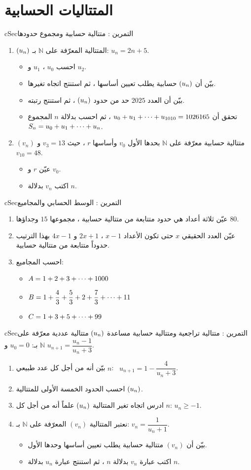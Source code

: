 \documentclass[12pt,a4paper]{article}
\newenvironment{BOX}[2]{\begin{otherlanguage}{english}\begin{arbox}{#1}{#2}}{\end{arbox}\end{otherlanguage}}
\newcounter{exo}
\newenvironment{tamrin}[1]{\stepcounter{exo}\begin{BOX}{cSec}{التمرين \theexo: #1}}{\end{BOX}}
\renewcommand{\cdots}{\mathinner{\cdotp\cdotp\cdotp}}
\newcommand{\N}{\mathbb{N}}
\newenvironment{sq}{\begin{itemize}[leftmargin=2.4em,itemsep=3pt]}{\end{itemize}}
\newcommand{\qa}{\item[(أ)]}\newcommand{\qb}{\item[(ب)]}\newcommand{\qc}{\item[(جـ)]}\newcommand{\qd}{\item[(د)]}\newcommand{\qe}{\item[(هـ)]}
\begin{document}
\section{المتتاليات الحسابية}
\begin{tamrin}{متتالية حسابية ومجموع حدودها}
\begin{enumerate}
\item $(u_n)$ المتتالية المعرّفة على $\N$ بـ: $u_n=2n+5$.
\begin{sq}
\qa احسب $u_0$ ، $u_1$ و $u_2$.
\qb بيّن أن $(u_n)$ حسابية يطلب تعيين أساسها ، ثم استنتج اتجاه تغيرها.
\qc بيّن أن العدد $2025$ حد من حدود $(u_n)$ ، ثم استنتج رتبته.
\qd تحقق أن $u_0+u_1+\cdots+u_{1010}=1026165$ ، ثم احسب بدلالة $n$ المجموع $S_n=u_0+u_1+\cdots+u_n$.
\end{sq}
\item $(v_n)$ متتالية حسابية معرّفة على $\N$ بحدها الأول $v_0$ وأساسها $r$ ، حيث $v_3=13$ و $v_{10}=48$.
\begin{sq}
\qa عيّن $r$ و $v_0$.
\qb اكتب $v_n$ بدلالة $n$.
\end{sq}
\end{enumerate}
\end{tamrin}

\begin{tamrin}{الوسط الحسابي والمجاميع}
\begin{enumerate}
\item عيّن ثلاثة أعداد هي حدود متتابعة من متتالية حسابية ، مجموعها $15$ وجداؤها $80$.
\item عيّن العدد الحقيقي $x$ حتى تكون الأعداد $x-1$ ، $2x+1$ و $4x-1$ بهذا الترتيب حدوداً متتابعة من متتالية حسابية.
\item احسب المجاميع:
\begin{sq}
\qa $A=1+2+3+\cdots+1000$
\qb $B=1+\dfrac43+\dfrac53+2+\dfrac73+\cdots+11$
\qc $C=1+3+5+\cdots+99$
\end{sq}
\end{enumerate}
\end{tamrin}

\begin{tamrin}{متتالية تراجعية ومتتالية حسابية مساعدة}
$(u_n)$ متتالية عددية معرّفة على $\N$ بـ: $u_0=0$ و $u_{n+1}=\dfrac{u_n-1}{u_n+3}$.
\begin{enumerate}
\item بيّن أنه من أجل كل عدد طبيعي $n$: \ $u_{n+1}=1-\dfrac{4}{u_n+3}$.
\item احسب الحدود الخمسة الأولى للمتتالية $(u_n)$.
\item ادرس اتجاه تغير المتتالية $(u_n)$ علماً أنه من أجل كل $n$: $u_n\ge-1$.
\item نعتبر المتتالية $(v_n)$ المعرّفة على $\N$ بـ: $v_n=\dfrac{1}{u_n+1}$.
\begin{sq}
\qa بيّن أن $(v_n)$ متتالية حسابية يطلب تعيين أساسها وحدها الأول.
\qb اكتب عبارة $v_n$ بدلالة $n$ ، ثم استنتج عبارة $u_n$ بدلالة $n$.
\end{sq}
\end{enumerate}
\end{tamrin}
\end{document}
